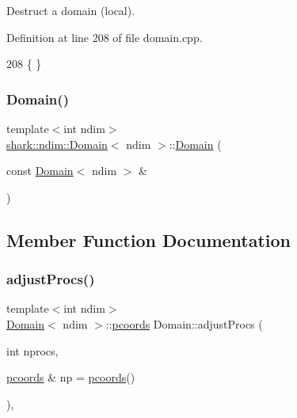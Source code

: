 Destruct a domain (local). 

Definition at line 208 of file domain.\+cpp.


\begin{DoxyCode}
208 \{ \}
\end{DoxyCode}
\hypertarget{classshark_1_1ndim_1_1_domain_abda6ddc2b302fd3a7012a2f52bdaff40}{}\label{classshark_1_1ndim_1_1_domain_abda6ddc2b302fd3a7012a2f52bdaff40} 
\subsubsection{\texorpdfstring{Domain()}{Domain()}\hspace{0.1cm}{\footnotesize\ttfamily [4/4]}}
{\footnotesize\ttfamily template$<$int ndim$>$ \\
\hyperlink{classshark_1_1ndim_1_1_domain}{shark\+::ndim\+::\+Domain}$<$ ndim $>$\+::\hyperlink{classshark_1_1ndim_1_1_domain}{Domain} (\begin{DoxyParamCaption}\item[{const \hyperlink{classshark_1_1ndim_1_1_domain}{Domain}$<$ ndim $>$ \&}]{ }\end{DoxyParamCaption})\hspace{0.3cm}{\ttfamily [delete]}}



\subsection{Member Function Documentation}
\hypertarget{classshark_1_1ndim_1_1_domain_a6d8aabbf8423bae3e392a4a87caf2185}{}\label{classshark_1_1ndim_1_1_domain_a6d8aabbf8423bae3e392a4a87caf2185} 
\subsubsection{\texorpdfstring{adjust\+Procs()}{adjustProcs()}}
{\footnotesize\ttfamily template$<$int ndim$>$ \\
\hyperlink{classshark_1_1ndim_1_1_domain}{Domain}$<$ ndim $>$\+::\hyperlink{classshark_1_1ndim_1_1_domain_a9684ccd8af33cff7639c782290ac37ee}{pcoords} Domain\+::adjust\+Procs (\begin{DoxyParamCaption}\item[{int}]{nprocs,  }\item[{\hyperlink{classshark_1_1ndim_1_1_domain_a9684ccd8af33cff7639c782290ac37ee}{pcoords} \&}]{np = {\ttfamily \hyperlink{classshark_1_1ndim_1_1_domain_a9684ccd8af33cff7639c782290ac37ee}{pcoords}()} }\end{DoxyParamCaption})\hspace{0.3cm}{\ttfamily [static]}, {\ttfamily [private]}}



